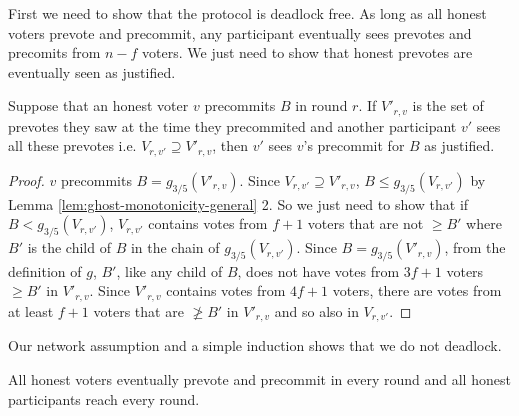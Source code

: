 \documentclass[a4paper,UKenglish,cleveref, autoref, thm-restate, anonymous]{lipics-v2019}
\begin{document}
{First we need to show that the protocol is deadlock free.
As long as all honest voters prevote and precommit, any participant eventually sees prevotes and precomits from $n-f$ voters. We just need to show that honest prevotes are eventually seen as justified.
\begin{lemma} Suppose that an honest voter $v$ precommits $B$ in round $r$. If $V'_{r,v}$ is the set of prevotes they saw at the time they precommited and another participant $v'$ sees all these prevotes i.e. $V_{r,v'} \supseteq V'_{r,v}$, then $v'$ sees $v$'s precommit for $B$ as justified. \end{lemma}
\begin{proof} $v$ precommits $B = g_{3/5}(V'_{r,v})$. Since $V_{r,v'} \supseteq V'_{r,v}$, $B \leq g_{3/5}(V_{r,v'})$ by Lemma \ref{lem:ghost-monotonicity-general} 2.
So we just need to show that if  $B < g_{3/5}(V_{r,v'})$, $V_{r,v'}$ contains votes from $f+1$ voters that are not $\geq B'$ where $B'$ is the child of $B$ in the chain of $g_{3/5}(V_{r,v'})$.
Since $B = g_{3/5}(V'_{r,v})$, from the definition of $g$, $B'$, like any child of $B$, does not have votes from $3f+1$ voters $\geq B'$ in $V'_{r,v}$.
Since $V'_{r,v}$ contains votes from $4f+1$ voters, there are votes from at least $f+1$ voters that are $\not \geq B'$ in $V'_{r,v}$ and so also in $V_{r,v'}$.
\end{proof}

Our network assumption and a simple induction shows that we do not deadlock.
\begin{corollary} All honest voters eventually prevote and precommit in every round and all honest participants reach every round.\end{corollary}

}
\end{document}

